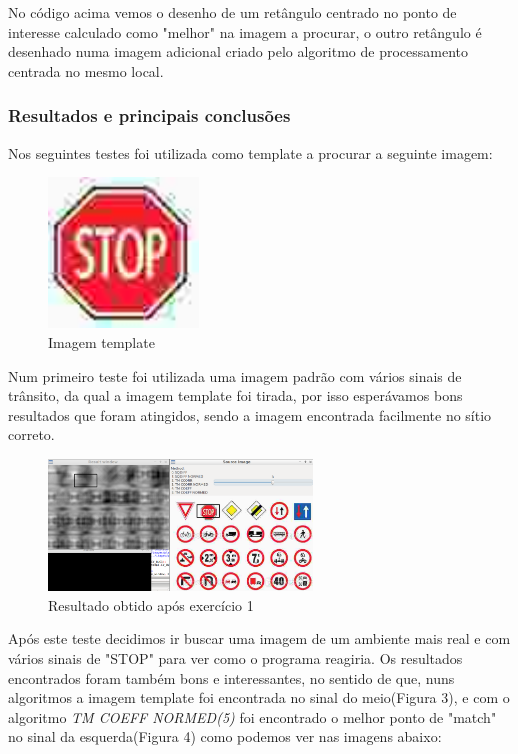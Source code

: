 \documentclass[portuguese, times, mirror]{revdetua}
\begin{document}
No código acima vemos o desenho de um retângulo centrado no ponto de interesse calculado como "melhor" na imagem a procurar, o outro retângulo é desenhado numa imagem adicional criado pelo algoritmo de processamento centrada no mesmo local.

\subsubsection{Resultados e principais conclusões}

Nos seguintes testes foi utilizada como template a procurar a seguinte imagem:

\begin{figure}[ht!]
\centering
\includegraphics[width=40mm]{img/stop.jpg}
\caption{Imagem template}
\end{figure}

Num primeiro teste foi utilizada uma imagem padrão com vários sinais de trânsito,  da qual a imagem template foi tirada, por isso esperávamos bons resultados que foram atingidos, sendo a imagem encontrada facilmente no sítio correto.

\begin{figure}[ht!]
\centering
\includegraphics[width=70mm]{img/ex1_1.png}
\caption{Resultado obtido após exercício 1}
\end{figure}

\newpage

Após este teste decidimos ir buscar uma imagem de um ambiente mais real e com vários sinais de "STOP" para ver como o programa reagiria. Os resultados encontrados foram também bons e interessantes, no sentido de que, nuns algoritmos a imagem template foi encontrada no sinal do meio(Figura 3), e com o algoritmo \textit{TM COEFF NORMED(5)} foi encontrado o melhor ponto de "match" no sinal da esquerda(Figura 4) como podemos ver nas imagens abaixo:
\end{document}
